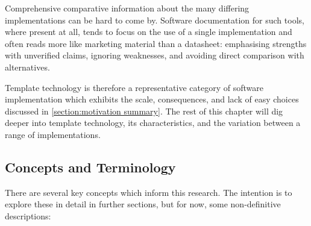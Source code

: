 Comprehensive comparative information about the many differing implementations can be hard to come by. Software documentation for such tools, where present at all, tends to focus on the use of a single implementation and often reads more like marketing material than a datasheet: emphasising strengths with unverified claims, ignoring weaknesses, and avoiding direct comparison with alternatives.

Template technology is therefore a representative category of software implementation which exhibits the scale, consequences, and lack of easy choices discussed in \autoref{section:motivation summary}. The rest of this chapter will dig deeper into template technology, its characteristics, and the variation between a range of implementations.

\subsection{Concepts and Terminology}

There are several key concepts which inform this research. The intention is to explore these in detail in further sections, but for now, some non-definitive descriptions:

